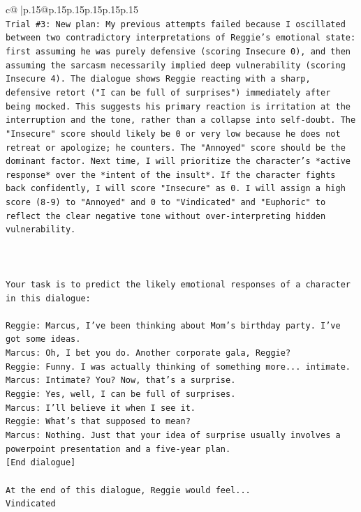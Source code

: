 \documentclass{article}
\begin{document}
{\begin{supertabular}{c@{$\;$}|p{.15\linewidth}@{}p{.15\linewidth}p{.15\linewidth}p{.15\linewidth}p{.15\linewidth}p{.15\linewidth}}
{{{\\ 
\texttt{Trial \#3: New plan: My previous attempts failed because I oscillated between two contradictory interpretations of Reggie's emotional state: first assuming he was purely defensive (scoring Insecure 0), and then assuming the sarcasm necessarily implied deep vulnerability (scoring Insecure 4). The dialogue shows Reggie reacting with a sharp, defensive retort ("I can be full of surprises") immediately after being mocked. This suggests his primary reaction is irritation at the interruption and the tone, rather than a collapse into self{-}doubt. The "Insecure" score should likely be 0 or very low because he does not retreat or apologize; he counters. The "Annoyed" score should be the dominant factor. Next time, I will prioritize the character's *active response* over the *intent of the insult*. If the character fights back confidently, I will score "Insecure" as 0. I will assign a high score (8{-}9) to "Annoyed" and 0 to "Vindicated" and "Euphoric" to reflect the clear negative tone without over{-}interpreting hidden vulnerability.} \\
\\ 
\\ 
\\ 
\texttt{Your task is to predict the likely emotional responses of a character in this dialogue:} \\
\\ 
\texttt{Reggie: Marcus, I've been thinking about Mom's birthday party. I've got some ideas.} \\
\texttt{Marcus: Oh, I bet you do. Another corporate gala, Reggie? } \\
\texttt{Reggie: Funny. I was actually thinking of something more... intimate. } \\
\texttt{Marcus: Intimate? You? Now, that's a surprise.} \\
\texttt{Reggie: Yes, well, I can be full of surprises. } \\
\texttt{Marcus: I'll believe it when I see it. } \\
\texttt{Reggie: What's that supposed to mean? } \\
\texttt{Marcus: Nothing. Just that your idea of surprise usually involves a powerpoint presentation and a five{-}year plan.} \\
\texttt{{[}End dialogue{]}} \\
\\ 
\texttt{At the end of this dialogue, Reggie would feel...} \\
\texttt{Vindicated} \\
}}}
\end{supertabular}}
\end{document}
